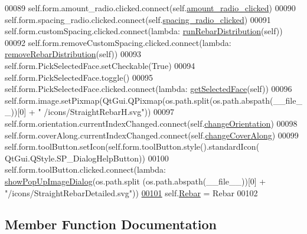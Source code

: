 \begin{DoxyCode}
00089         self.form.amount\_radio.clicked.connect(self.\hyperlink{classStraightRebar_1_1__StraightRebarTaskPanel_a845630e065bb13e756284e71476dd755}{amount\_radio\_clicked})
00090         self.form.spacing\_radio.clicked.connect(self.\hyperlink{classStraightRebar_1_1__StraightRebarTaskPanel_a03ed1cd992f5b138153b6a45de7777f9}{spacing\_radio\_clicked})
00091         self.form.customSpacing.clicked.connect(\textcolor{keyword}{lambda}: \hyperlink{namespaceRebarDistribution_aa547df5cb10d2e64eaa0b51c445fa30b}{runRebarDistribution}(self))
00092         self.form.removeCustomSpacing.clicked.connect(\textcolor{keyword}{lambda}: 
      \hyperlink{namespaceRebarDistribution_a85270a1b6e8c782a9e0ba54add518f2a}{removeRebarDistribution}(self))
00093         self.form.PickSelectedFace.setCheckable(\textcolor{keyword}{True})
00094         self.form.PickSelectedFace.toggle()
00095         self.form.PickSelectedFace.clicked.connect(\textcolor{keyword}{lambda}: \hyperlink{namespaceRebarfunc_a8c003df49ac5f249bd9ea4acfb7d2f8d}{getSelectedFace}(self))
00096         self.form.image.setPixmap(QtGui.QPixmap(os.path.split(os.path.abspath(\_\_file\_\_))[0] + \textcolor{stringliteral}{"
      /icons/StraightRebarH.svg"}))
00097         self.form.orientation.currentIndexChanged.connect(self.\hyperlink{classStraightRebar_1_1__StraightRebarTaskPanel_abd7abec4d263edf53efb18396857b370}{changeOrientation})
00098         self.form.coverAlong.currentIndexChanged.connect(self.\hyperlink{classStraightRebar_1_1__StraightRebarTaskPanel_ae99010cf766375812bf24f80cd3f60e1}{changeCoverAlong})
00099         self.form.toolButton.setIcon(self.form.toolButton.style().standardIcon(
      QtGui.QStyle.SP\_DialogHelpButton))
00100         self.form.toolButton.clicked.connect(\textcolor{keyword}{lambda}: \hyperlink{namespacePopUpImage_a8c565620d7de9b4882a44eacb870ad05}{showPopUpImageDialog}(os.path.split
      (os.path.abspath(\_\_file\_\_))[0] + \textcolor{stringliteral}{"/icons/StraightRebarDetailed.svg"}))
\hypertarget{classStraightRebar_1_1__StraightRebarTaskPanel.tex_l00101}{}\hyperlink{classStraightRebar_1_1__StraightRebarTaskPanel_a23fe17475277eae59cbed538f0f183cb}{00101}         self.\hyperlink{classStraightRebar_1_1__StraightRebarTaskPanel_a23fe17475277eae59cbed538f0f183cb}{Rebar} = Rebar
00102 
\end{DoxyCode}


\subsection{Member Function Documentation}
